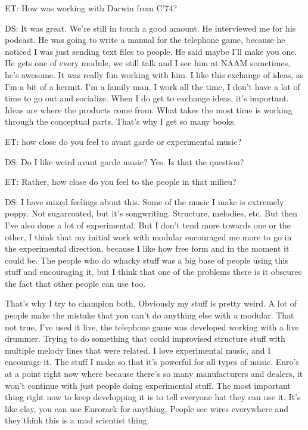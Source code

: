 ET: How was working with Darwin from C'74?

DS: It was great. We're still in touch a good amount. He interviewed me for his podcast. He was going to write a manual for the telephone game, because he noticed I was just sending text files to people. He said maybe I'll make you one. He gets one of every module, we still talk and I see him at NAAM sometimes, he's awesome. It was really fun working with him. I like this exchange of ideas, as I'm a bit of a hermit. I'm a family man, I work all the time, I don't have a lot of time to go out and socialize. When I do get to exchange ideas, it's important. Ideas are where the products come from. What takes the most time is working through the conceptual parts. That's why I get so many books. 

ET: how close do you feel to avant garde or experimental music? 

DS: Do I like weird avant garde music? Yes. Is that the question? 

ET: Rather, how close do you feel to the people in that milieu?

DS: I have mixed feelings about this. Some of the music I make is extremely poppy. Not sugarcoated, but it's songwriting. Structure, melodies, etc. But then I've also done a lot of experimental. But I don't tend more towards one or the other, I think that my initial work with modular encouraged me more to go in the experimental direction, because I like how free form and in the moment it could be. The people who do whacky stuff was a big base of people using this stuff and encouraging it, but I think that one of the problems there is it obscures the fact that other people can use too. 

That's why I try to champion both. Obviously my stuff is pretty weird. A lot of people make the mistake that you can't do anything else with a modular. That not true, I've used it live, the telephone game was developed working with a live drummer. Trying to do something that could improvised structure stuff with multiple melody lines that were related. I love experimental music, and I encourage it. The stuff I make so that it's powerful for all types of music. Euro's at a point right now where because there's so many manufacturers and dealers, it won't continue with just people doing experimental stuff. The most important thing right now to keep developping it is to tell everyone hat they can use it. It's like clay, you can use Eurorack for anything. People see wires everywhere and they think this is a mad scientist thing.

